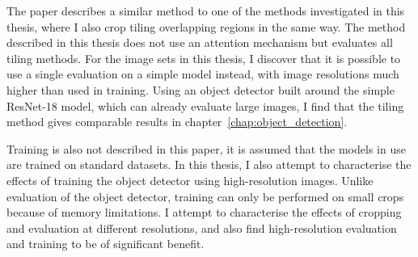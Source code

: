 The paper describes a similar method to one of the methods investigated in this thesis, where I also crop tiling overlapping regions in the same way. The method described in this thesis does not use an attention mechanism but evaluates all tiling methods. For the image sets in this thesis, I discover that it is possible to use a single evaluation on a simple model instead, with image resolutions much higher than used in training. Using an object detector built around the simple ResNet-18 model, which can already evaluate large images,  I find that the tiling method gives comparable results in chapter~\ref{chap:object_detection}.
 
Training is also not described in this paper, it is assumed that the models in use are trained on standard datasets. In this thesis, I also attempt to characterise the effects of training the object detector using high-resolution images. Unlike evaluation of the object detector, training can only be performed on small crops because of memory limitations. I attempt to characterise the effects of cropping and evaluation at different resolutions, and also find high-resolution evaluation and training to be of significant benefit.
